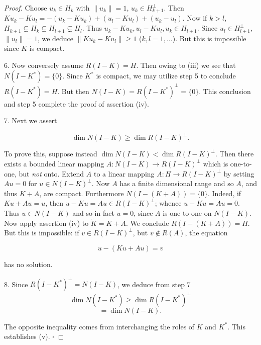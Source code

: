 \begin{proof}
Choose $u_k \in H_k$ with $\|u_k\| = 1$, $u_k \in H_{k+1}^\perp$. Then $Ku_k - Ku_l = -(u_k - Ku_k) + (u_l - Ku_l) + (u_k - u_l)$. Now if $k > l$, $H_{k+1} \subsetneq H_k \subsetneq H_{l+1} \subsetneq H_l$. Thus $u_k - Ku_k, u_l - Ku_l, u_k \in H_{l+1}$. Since $u_l \in H_{l+1}^\perp$, $\|u_l\| = 1$, we deduce $\|Ku_k - Ku_l\| \geq 1$ ($k, l = 1, \ldots$). But this is impossible since $K$ is compact.

6. Now conversely assume $R(I - K) = H$. Then owing to (iii) we see that $N(I - K^*) = \{0\}$. Since $K^*$ is compact, we may utilize step 5 to conclude $R(I - K^*) = H$. But then $N(I - K) = R(I - K^*)^\perp = \{0\}$. This conclusion and step 5 complete the proof of assertion (iv).

7. Next we assert

$$\dim N(I - K) \geq \dim R(I - K)^\perp.$$

To prove this, suppose instead $\dim N(I - K) < \dim R(I - K)^\perp$. Then there exists a bounded linear mapping $A : N(I - K) \to R(I - K)^\perp$ which is one-to-one, but \textit{not} onto. Extend $A$ to a linear mapping $A : H \to R(I - K)^\perp$ by setting $Au = 0$ for $u \in N(I - K)^\perp$. Now $A$ has a finite dimensional range and so $A$, and thus $K + A$, are compact. Furthermore $N(I - (K + A)) = \{0\}$. Indeed, if $Ku + Au = u$, then $u - Ku = Au \in R(I - K)^\perp$; whence $u - Ku = Au = 0$. Thus $u \in N(I - K)$ and so in fact $u = 0$, since $A$ is one-to-one on $N(I - K)$. Now apply assertion (iv) to $\tilde{K} = K + A$. We conclude $R(I - (K + A)) = H$. But this is impossible: if $v \in R(I - K)^\perp$, but $v \notin R(A)$, the equation

$$u - (Ku + Au) = v$$

has no solution.

8. Since $R(I - K^*)^{\perp} = N(I - K)$, we deduce from step 7
$$\dim N(I - K^*) \geq \dim R(I - K^*)^{\perp}$$
$$= \dim N(I - K).$$

The opposite inequality comes from interchanging the roles of $K$ and $K^*$. This establishes (v). $\square$
\end{proof}

